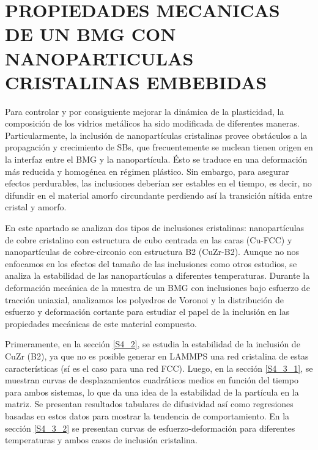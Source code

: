 
\chapter{PROPIEDADES MECANICAS DE UN BMG CON NANOPARTICULAS CRISTALINAS EMBEBIDAS} %

\label{C4} %


Para controlar y por consiguiente mejorar la dinámica de la plasticidad, la composición de los vidrios metálicos ha sido modificada de diferentes maneras. Particularmente, la inclusión de nanopartículas cristalinas provee obstáculos a la propagación y crecimiento de SBs, que frecuentemente se nuclean tienen origen en la interfaz entre el BMG y la nanopartícula. Ésto se traduce en una deformación más reducida y homogénea en régimen plástico. Sin embargo, para asegurar efectos perdurables, las inclusiones deberían ser estables en el tiempo, es decir, no difundir en el material amorfo circundante perdiendo así la transición nítida entre cristal y amorfo.

En este apartado se analizan dos tipos de inclusiones cristalinas: nanopartículas de cobre cristalino con estructura de cubo centrada en las caras (Cu-FCC) y nanopartículas de cobre-circonio con estructura B2 (CuZr-B2). Aunque no nos enfocamos en los efectos del tamaño de las inclusiones como otros estudios, se analiza la estabilidad de las nanopartículas a diferentes temperaturas. Durante la deformación mecánica de la muestra de un BMG con inclusiones bajo esfuerzo de tracción uniaxial, analizamos los polyedros de Voronoi y la distribución de esfuerzo y deformación cortante para estudiar el papel de la inclusión en las propiedades mecánicas de este material compuesto.

Primeramente, en la sección \ref{S4_2}, se estudia la estabilidad de la inclusión de CuZr (B2), ya que no es posible generar en LAMMPS una red cristalina de estas características (sí es el caso para una red FCC). Luego, en la sección \ref{S4_3_1}, se muestran curvas de desplazamientos cuadráticos medios en función del tiempo para ambos sistemas, lo que da una idea de la estabilidad de la partícula en la matriz. Se presentan resultados tabulares de difusividad así como regresiones basadas en estos datos para mostrar la tendencia de comportamiento. En la sección \ref{S4_3_2} se presentan curvas de esfuerzo-deformación para diferentes temperaturas y ambos casos de inclusión cristalina.

